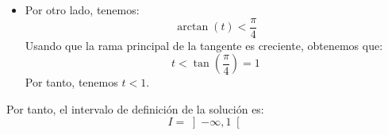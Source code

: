\documentclass[12pt]{article}
\begin{document}
\begin{ejercicio}
\begin{itemize}
            \item Por otro lado, tenemos:
            \begin{equation*}
                \arctan(t)<\dfrac{\pi}{4}
            \end{equation*}
            Usando que la rama principal de la tangente es creciente, obtenemos que:
            \begin{equation*}
                t<\tan\left(\dfrac{\pi}{4}\right)=1
            \end{equation*}
            Por tanto, tenemos $t<1$.
        \end{itemize}
        Por tanto, el intervalo de definición de la solución es:
        \begin{equation*}
            I=\left]-\infty,1\right[
        \end{equation*}        
    \end{ejercicio}
\end{document}
